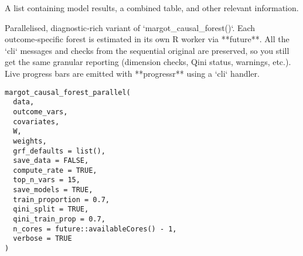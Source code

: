 \documentclass[a4paper]{book}
\begin{document}
%
\begin{Value}
A list containing model results, a combined table, and other relevant information.
\end{Value}
%
\begin{Description}
Parallelised, diagnostic‑rich variant of `margot\_causal\_forest()`.  Each
outcome‑specific forest is estimated in its own R worker via **future**.  All
the `cli` messages and checks from the sequential original are preserved, so
you still get the same granular reporting (dimension checks, Qini status,
warnings, etc.).  Live progress bars are emitted with **progressr** using a
`cli` handler.
\end{Description}
%
\begin{Usage}
\begin{verbatim}
margot_causal_forest_parallel(
  data,
  outcome_vars,
  covariates,
  W,
  weights,
  grf_defaults = list(),
  save_data = FALSE,
  compute_rate = TRUE,
  top_n_vars = 15,
  save_models = TRUE,
  train_proportion = 0.7,
  qini_split = TRUE,
  qini_train_prop = 0.7,
  n_cores = future::availableCores() - 1,
  verbose = TRUE
)
\end{verbatim}
\end{Usage}
%
\end{document}
